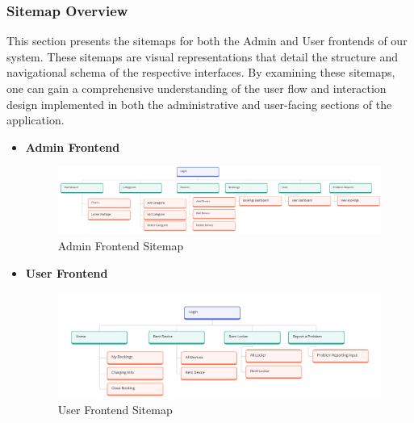 \subsubsection{Sitemap Overview}
This section presents the sitemaps for both the Admin and User frontends of our system. These sitemaps are visual representations that detail the structure and navigational schema of the respective interfaces. By examining these sitemaps, one can gain a comprehensive understanding of the user flow and interaction design implemented in both the administrative and user-facing sections of the application.
\begin{itemize}
\item \textbf {Admin Frontend}
\begin{figure}[h]
    \centering
    \includegraphics[width=1\textwidth]{images/Sitemap.jpg}
    \caption{Admin Frontend Sitemap}
    \label{fig:myimage}
\end{figure}
\clearpage
\item \textbf {User Frontend}
\begin{figure}[h]
    \centering
    \includegraphics[width=1\textwidth]{images/usersitemap.jpg}
    \caption{User Frontend Sitemap}
    \label{fig:myimage}
\end{figure}
\end{itemize}

